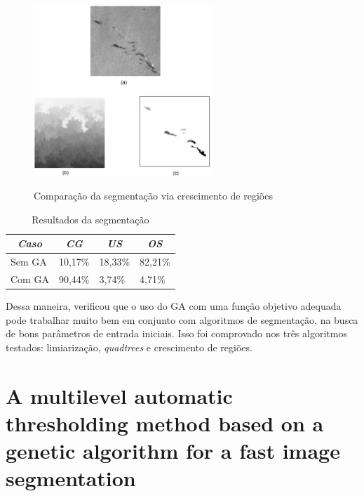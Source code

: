 \documentclass[12pt,oneside,a4paper,english,french,spanish,brazil,]{abntex2}
\begin{document}
\begin{figure}[ht]
\centering
\caption{Comparação da segmentação via crescimento de regiões}
\includegraphics[width=0.6\textwidth]{imagens/TrCo_Matias_Crescimento_1.PNG}
\label{fig:TrCo_Matias_Crescimento_1}
\end{figure}

\begin{table}
\centering
\caption{Resultados da segmentação}
\label{tab:TrCo_Matias_1}
\begin{tabular}{llll}
\hline
\multicolumn{1}{c}{\textit{\textbf{Caso}}} & \multicolumn{1}{c}{\textit{\textbf{CG}}} & \multicolumn{1}{c}{\textit{\textbf{US}}} & \multicolumn{1}{c}{\textit{\textbf{OS}}} \\ \hline
Sem GA                                     & 10,17\%                                  & 18,33\%                                  & 82,21\%                                  \\
Com GA                                     & 90,44\%                                  & 3,74\%                                   & 4,71\%                                   \\ \hline
\end{tabular}
\end{table}

Dessa maneira, \citet{matias:2007} verificou que o uso do GA com uma função objetivo adequada pode trabalhar muito bem em conjunto com algoritmos de segmentação, na busca de bons parâmetros de entrada iniciais. Isso foi comprovado nos três algoritmos testados: limiarização, \textit{quadtrees} e crescimento de regiões.

\section{A multilevel automatic thresholding method based on a genetic algorithm for a fast image segmentation}
\end{document}

